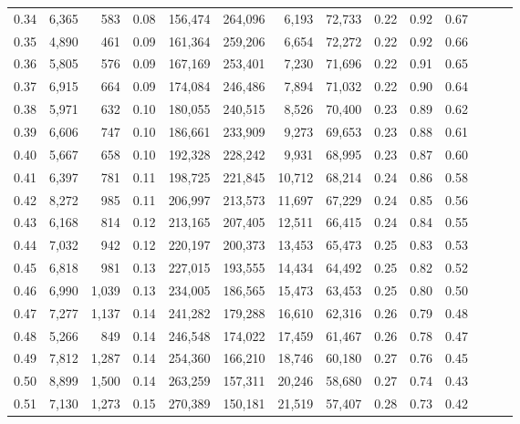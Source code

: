 \begin{tabular}{rrrrrrrrrrrrrr}
0.34 &   6,365 &    583 &  0.08 &  156,474 &  264,096 &   6,193 &  72,733 &  0.22 &  0.92 &      0.67 \\
0.35 &   4,890 &    461 &  0.09 &  161,364 &  259,206 &   6,654 &  72,272 &  0.22 &  0.92 &      0.66 \\
0.36 &   5,805 &    576 &  0.09 &  167,169 &  253,401 &   7,230 &  71,696 &  0.22 &  0.91 &      0.65 \\
0.37 &   6,915 &    664 &  0.09 &  174,084 &  246,486 &   7,894 &  71,032 &  0.22 &  0.90 &      0.64 \\
0.38 &   5,971 &    632 &  0.10 &  180,055 &  240,515 &   8,526 &  70,400 &  0.23 &  0.89 &      0.62 \\
0.39 &   6,606 &    747 &  0.10 &  186,661 &  233,909 &   9,273 &  69,653 &  0.23 &  0.88 &      0.61 \\
0.40 &   5,667 &    658 &  0.10 &  192,328 &  228,242 &   9,931 &  68,995 &  0.23 &  0.87 &      0.60 \\
0.41 &   6,397 &    781 &  0.11 &  198,725 &  221,845 &  10,712 &  68,214 &  0.24 &  0.86 &      0.58 \\
0.42 &   8,272 &    985 &  0.11 &  206,997 &  213,573 &  11,697 &  67,229 &  0.24 &  0.85 &      0.56 \\
0.43 &   6,168 &    814 &  0.12 &  213,165 &  207,405 &  12,511 &  66,415 &  0.24 &  0.84 &      0.55 \\
0.44 &   7,032 &    942 &  0.12 &  220,197 &  200,373 &  13,453 &  65,473 &  0.25 &  0.83 &      0.53 \\
0.45 &   6,818 &    981 &  0.13 &  227,015 &  193,555 &  14,434 &  64,492 &  0.25 &  0.82 &      0.52 \\
0.46 &   6,990 &  1,039 &  0.13 &  234,005 &  186,565 &  15,473 &  63,453 &  0.25 &  0.80 &      0.50 \\
0.47 &   7,277 &  1,137 &  0.14 &  241,282 &  179,288 &  16,610 &  62,316 &  0.26 &  0.79 &      0.48 \\
0.48 &   5,266 &    849 &  0.14 &  246,548 &  174,022 &  17,459 &  61,467 &  0.26 &  0.78 &      0.47 \\
0.49 &   7,812 &  1,287 &  0.14 &  254,360 &  166,210 &  18,746 &  60,180 &  0.27 &  0.76 &      0.45 \\
0.50 &   8,899 &  1,500 &  0.14 &  263,259 &  157,311 &  20,246 &  58,680 &  0.27 &  0.74 &      0.43 \\
0.51 &   7,130 &  1,273 &  0.15 &  270,389 &  150,181 &  21,519 &  57,407 &  0.28 &  0.73 &      0.42 \\

\end{tabular}
